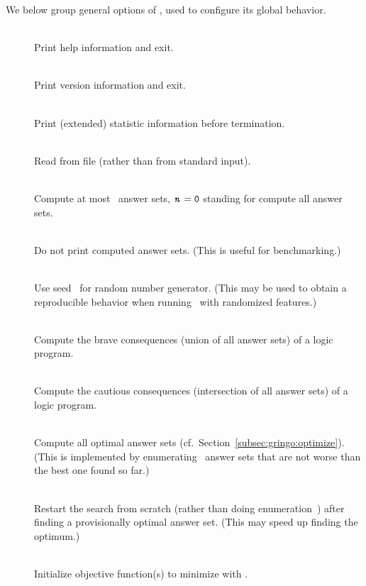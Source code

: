 We below group general options of \clasp,
used to configure its global behavior.
%
\begin{description}
\item[]~\\
Print help information and exit.
\item[]~\\
Print version information and exit.
\item[]~\\
Print (extended) statistic information before termination.
\item[]~\\
Read from file  (rather than from standard input).
\item[]~\\
Compute at most~ answer sets,
$\texttt{\textit{n}}=\texttt{0}$ standing for compute all answer sets.
\item[]~\\
Do not print computed answer sets.
(This is useful for benchmarking.)
\item[]~\\
Use seed~ for random number generator.
(This may be used to obtain a reproducible behavior
 when running \clasp\ with randomized features.)
\item[]~\\
Compute the brave consequences (union of all answer sets) of a logic program.
\item[]~\\
Compute the cautious consequences (intersection of all answer sets) of a logic program.
\item[]~\\
Compute all optimal answer sets (cf.\ Section~\ref{subsec:gringo:optimize}).
(This is implemented by enumerating~\cite{gekanesc07c} answer sets that are not worse
 than the best one found so far.)
\item[]~\\
Restart the search from scratch (rather than doing enumeration~\cite{gekanesc07c})
after finding a provisionally optimal answer set.
(This may speed up finding the optimum.)
\item[]~\\
Initialize objective function(s) to minimize with .

\end{description}
